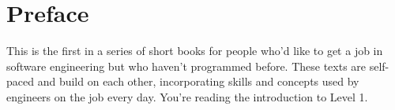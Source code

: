 \chapter{Preface}

This is the first in a series of short books for people who'd like to get a job in software engineering but who haven't programmed before. These texts are self-paced and build on each other, incorporating skills and concepts used by engineers on the job every day. You're reading the introduction to Level 1. 
